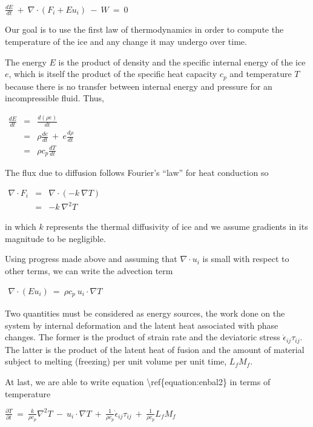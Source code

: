 $
\frac{dE}{dt}~+~\nabla \cdot \left(F_{i} +E u_{i}  \right)~-~W~=~0
$

Our goal is to use the first law of thermodynamics in order to compute
the temperature of the ice and any change it may undergo over time.

The energy $E$ is the product of density and the specific internal
energy of the ice $e$, which is itself the product of the specific heat
capacity $c_{p}$ and temperature $T$ because there is no transfer
between internal energy and pressure for an incompressible fluid. Thus,

$\begin{matrix}
\frac{dE}{dt}&=&\frac{d\left(\rho e \right)}{dt} \\
&=&\rho\frac{de}{dt}~+~e \frac{d\rho}{dt}\\
&=&\rho c_{p} \frac{dT}{dt}
\end{matrix}$

The flux due to diffusion follows Fourier's ``law'' for heat conduction
so

$\begin{matrix}
\nabla \cdot F_{i}&=&\nabla \cdot \left( -k ~\nabla T  \right) \\
&=&-k~\nabla^{2}T
\end{matrix}$

in which $k$ represents the thermal diffusivity of ice and we assume
gradients in its magnitude to be negligible.

Using progress made above and assuming that $\nabla \cdot u_{i}$ is
small with respect to other terms, we can write the advection term

$\begin{matrix}
\nabla \cdot \left(E u_{i} \right)~=~\rho c_{p}~ u_{i} \cdot \nabla T  
\end{matrix}$

Two quantities must be considered as energy sources, the work done on
the system by internal deformation and the latent heat associated with
phase changes. The former is the product of strain rate and the
deviatoric stress $\dot{\epsilon}_{ij} \tau_{ij}$. The latter is the
product of the latent heat of fusion and the amount of material subject
to melting (freezing) per unit volume per unit time, $L_{f}M_{f}$.

At last, we are able to write equation
\textbackslash{}ref\{equation:enbal2\} in terms of temperature

$
\frac{\partial T}{\partial t}~=~\frac{k}{\rho c_{p}} \nabla^{2}T~-~u_{i}\cdot \nabla T~+~\frac{1}{\rho c_{p}} \dot{\epsilon}_{ij} \tau_{ij} ~+~\frac{1}{\rho c_{p}} L_{f} M_{f}
$

